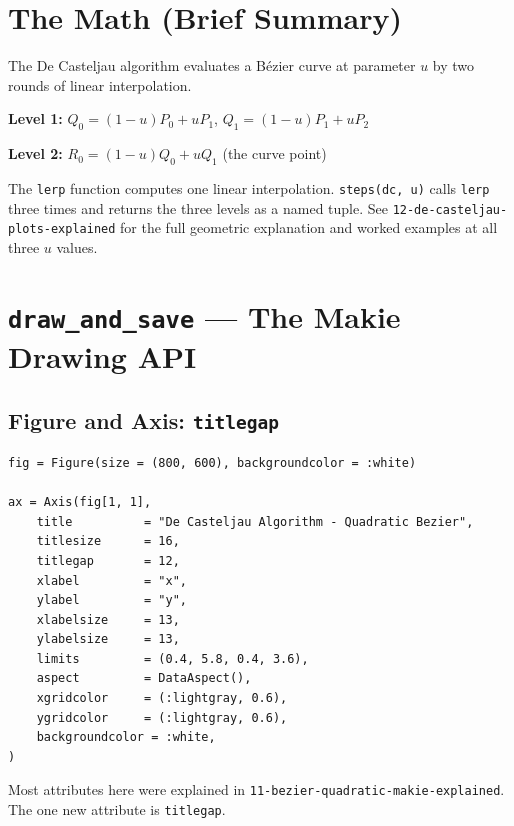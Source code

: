 \documentclass[12pt, a4paper]{article}
\newcommand{\cd}[1]{\texttt{#1}}
\begin{document}
\section{The Math (Brief Summary)}

The De Casteljau algorithm evaluates a B\'ezier curve at
parameter $u$ by two rounds of linear interpolation.

\textbf{Level 1:}
$Q_0 = (1-u)P_0 + uP_1$, \quad $Q_1 = (1-u)P_1 + uP_2$

\textbf{Level 2:}
$R_0 = (1-u)Q_0 + uQ_1$ \quad (the curve point)

The \cd{lerp} function computes one linear interpolation.
\cd{steps(dc, u)} calls \cd{lerp} three times and returns
the three levels as a named tuple.
See \cd{12-de-casteljau-plots-explained} for the full
geometric explanation and worked examples at all three
$u$ values.


\section{\texttt{draw\_and\_save} --- The Makie Drawing API}

\subsection{Figure and Axis: \texttt{titlegap}}

\begin{verbatim}
fig = Figure(size = (800, 600), backgroundcolor = :white)

ax = Axis(fig[1, 1],
    title          = "De Casteljau Algorithm - Quadratic Bezier",
    titlesize      = 16,
    titlegap       = 12,
    xlabel         = "x",
    ylabel         = "y",
    xlabelsize     = 13,
    ylabelsize     = 13,
    limits         = (0.4, 5.8, 0.4, 3.6),
    aspect         = DataAspect(),
    xgridcolor     = (:lightgray, 0.6),
    ygridcolor     = (:lightgray, 0.6),
    backgroundcolor = :white,
)
\end{verbatim}

Most attributes here were explained in
\cd{11-bezier-quadratic-makie-explained}.
The one new attribute is \cd{titlegap}.
\end{document}
